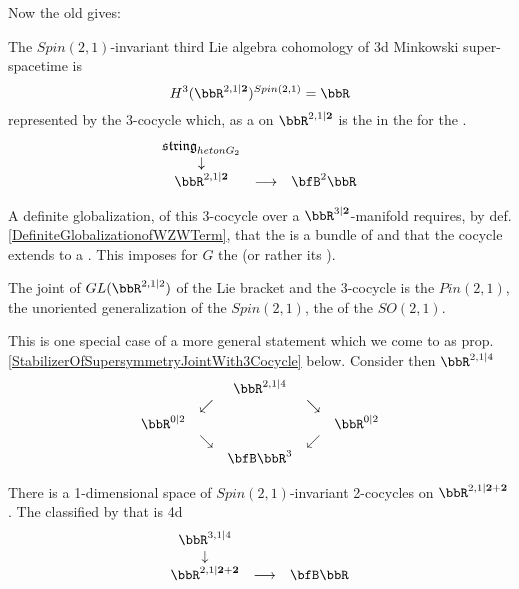 Now the old  gives:
\begin{prop}
\label{}\hypertarget{}{}
The $Spin(2,1)$-invariant third Lie algebra cohomology of 3d Minkowski super-spacetime is
\begin{displaymath}
H^3(\bbR^{2,1\vert \mathbf{2}})^{Spin(2,1)} = \bbR
\end{displaymath}
represented by the 3-cocycle which, as a   on $\bbR^{2,1\vert \mathbf{2}}$ is the  in the  for the .
\begin{displaymath}
\itexarray{
\mathfrak{string}_{het  on  G_2}
\\
\downarrow
\\
\bbR^{2,1\vert \mathbf{2}}
&\stackrel{}{\longrightarrow}&
\bfB^2 \bbR
}
\end{displaymath}
\end{prop}
A definite globalization, of this 3-cocycle over a $\bbR^{3\vert \mathbf{2}}$-manifold requires, by def. \ref{DefiniteGlobalizationofWZWTerm}, that the  is a bundle of  and that the cocycle extends to a . This imposes  for $G$ the  (or rather its  ).
\begin{prop}
\label{}\hypertarget{}{}
The joint  of $GL(\bbR^{2,1\vert 2})$ of the Lie bracket and the 3-cocycle is the  $Pin(2,1)$, the unoriented generalization of the  $Spin(2,1)$, the  of the  $SO(2,1)$.
\end{prop}
This is one special case of a more general statement which we come to as prop. \ref{StabilizerOfSupersymmetryJointWith3Cocycle} below.
Consider then $\bbR^{2,1\vert 4}$
\begin{displaymath}
\itexarray{
&& \bbR^{2,1\vert 4}
\\
& \swarrow && \searrow
\\
\bbR^{0 \vert 2} && && \bbR^{0\vert 2}
\\
& \searrow && \swarrow
\\
&& \bfB \bbR^3
}
\end{displaymath}
\begin{prop}
\label{4dSuperMinkowskiSpacetime}\hypertarget{4dSuperMinkowskiSpacetime}{}
There is a 1-dimensional space of $Spin(2,1)$-invariant 2-cocycles on $\bbR^{2,1\vert \mathbf{2} + \mathbf{2}}$. The  classified by that is 4d 
\begin{displaymath}
\itexarray{
\bbR^{3,1\vert 4}
\\
\downarrow
\\
\bbR^{2,1\vert \mathbf{2}+{\mathbf{2}}}
&\longrightarrow&
\bfB\bbR
}
\end{displaymath}
\end{prop}
